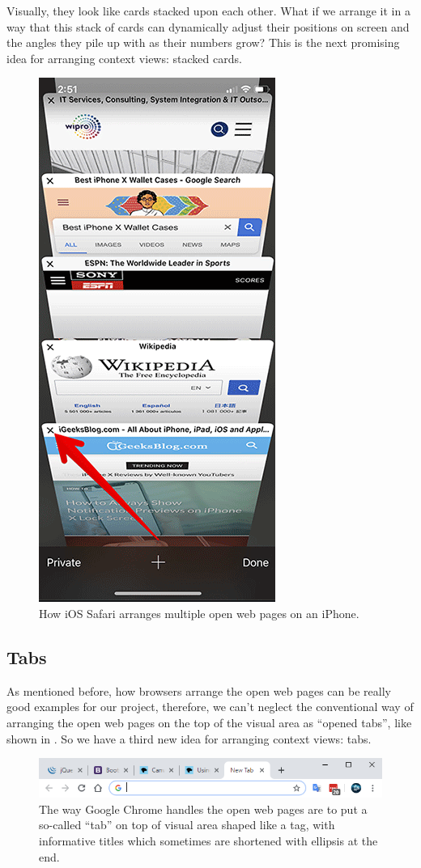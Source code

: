 Visually, they look like cards stacked upon each other. What if we arrange it in a way that this stack of cards can dynamically adjust their positions on screen and the angles they pile up with as their numbers grow? This is the next promising idea for arranging context views: stacked cards.

\begin{figure}[th]
\centering
\includegraphics[width=.4\textwidth,keepaspectratio]{Figures/Chapter1/iossafari.png}
\decoRule
\caption[Means of Arrangements on iOS Safari]{How iOS Safari arranges multiple open web pages on an iPhone.}
\label{fig:iossafari}
\end{figure}

\subsection{Tabs}

As mentioned before, how browsers arrange the open web pages can be really good examples for our project, therefore, we can't neglect the conventional way of arranging the open web pages on the top of the visual area as ``opened tabs'', like shown in . So we have a third new idea for arranging context views: tabs.

\begin{figure}[H]
\centering
\includegraphics[width=\textwidth,keepaspectratio]{Figures/Chapter1/tabs.png}
\decoRule
\caption[How Google Chrome Arranged Objects of Interest]{The way Google Chrome handles the open web pages are to put a so-called ``tab'' on top of visual area shaped like a tag, with informative titles which sometimes are shortened with ellipsis at the end.}
\label{fig:tabs}
\end{figure}

